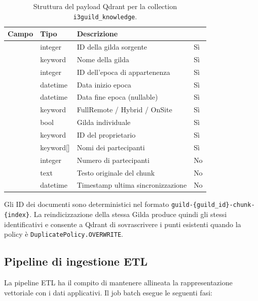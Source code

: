 \begin{table}[ht]
  \centering
  \caption{Struttura del payload Qdrant per la collection
    \texttt{i3guild\_knowledge}.}
  \label{tab:qdrant_payload}
  \small
  \begin{tabular}{L{3.7cm}L{2cm}L{5.8cm}L{1.4cm}}
    \toprule
    \textbf{Campo} & \textbf{Tipo} & \textbf{Descrizione} &
       \\
    \midrule
     & integer & ID della gilda sorgente & Sì \\
     & keyword & Nome della gilda & Sì \\
     & integer & ID dell'epoca di appartenenza & Sì \\
     & datetime & Data inizio epoca & Sì \\
     & datetime & Data fine epoca (nullable) & Sì \\
     & keyword & FullRemote / Hybrid / OnSite & Sì \\
     & bool & Gilda individuale & Sì \\
     & keyword & ID del proprietario & Sì \\
     & keyword[] & Nomi dei partecipanti & Sì \\
     & integer & Numero di partecipanti & No \\
     & text & Testo originale del chunk & No \\
     & datetime & Timestamp ultima sincronizzazione & No \\
    \bottomrule
  \end{tabular}
\end{table}

Gli ID dei documenti sono deterministici nel formato
\texttt{guild-\{guild\_id\}-chunk-\{index\}}. La reindicizzazione della stessa
Gilda produce quindi gli stessi identificativi e consente a Qdrant di
sovrascrivere i punti esistenti quando la policy è
\texttt{DuplicatePolicy.OVERWRITE}.

\subsection{Pipeline di ingestione ETL}
\label{subsec:ingestion_pipeline}

La pipeline ETL ha il compito di mantenere allineata la rappresentazione
vettoriale con i dati applicativi. Il job batch esegue le seguenti fasi:

